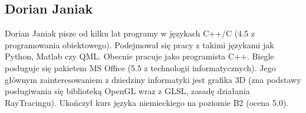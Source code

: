 \subsection{Dorian Janiak}
Dorian Janiak pisze od kilku lat programy w językach C++/C (4.5 z programowania obiektowego).
Podejmował się pracy z takimi językami jak Python, Matlab czy QML.
Obecnie pracuje jako programista C++. Biegle posługuje się pakietem MS Office (5.5 z technologii informatycznych). 
Jego głównym zainteresowaniem z dziedziny informatyki jest grafika 3D (zna podstawy posługiwania się biblioteką OpenGL wraz z GLSL, zasadę działania RayTracingu).
Ukończył kurs języka niemieckiego na poziomie B2 (ocena 5.0).
